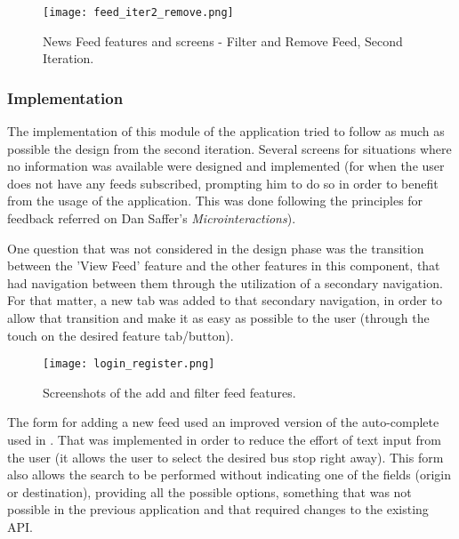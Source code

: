 \begin{figure}[htb]
  \begin{center}
    \leavevmode
    \texttt{[image: feed\_iter2\_remove.png]}
    \caption{News Feed features and screens - Filter and Remove Feed, Second Iteration.}
    \label{fig:feed_iter2_remove}
  \end{center}
\end{figure}

\subsubsection{Implementation} 

The implementation of this module of the application tried to follow as much as possible the design from the second iteration. Several screens for situations where no information was available were designed and implemented (for when the user does not have any feeds subscribed, prompting him to do so in order to benefit from the usage of the application. This was done following the principles for feedback referred on Dan Saffer's \emph{Microinteractions}\cite{kn:Saffer}).

One question that was not considered in the design phase was the transition between the 'View Feed' feature and the other features in this component, that had navigation between them through the utilization of a secondary navigation. For that matter, a new tab was added to that secondary navigation, in order to allow that transition and make it as easy as possible to the user (through the touch on the desired feature tab/button).

\begin{figure}[!h]
  \begin{center}
    \leavevmode
    \texttt{[image: login\_register.png]}
    \caption{Screenshots of the add and filter feed features.}
    \label{fig:feed1}
  \end{center}
\end{figure}

The form for adding a new feed used an improved version of the auto-complete used in \cite{kn:Gon12}. That was implemented in order to reduce the effort of text input from the user (it allows the user to select the desired bus stop right away). This form also allows the search to be performed without indicating one of the fields (origin or destination), providing all the possible options, something that was not possible in the previous application and that required changes to the existing API.

